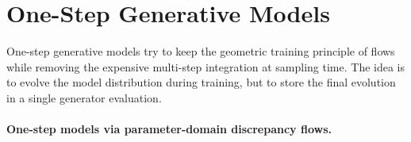 
\section{One-Step Generative Models}

One-step generative models try to keep the geometric training principle of flows while removing the expensive multi-step integration at sampling time. The idea is to evolve the model distribution during training, but to store the final evolution in a single generator evaluation.

\paragraph{One-step models via parameter-domain discrepancy flows.}


